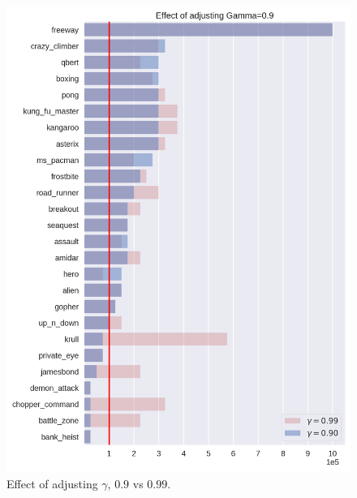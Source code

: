 \begin{figure}
\centering
\includegraphics[width=0.9\columnwidth]{figures/eval_sd_g90.png}
\caption{Effect of adjusting $\gamma$, $0.9$ vs $0.99$.} 
\label{fig:adj_gamma}
\end{figure}

